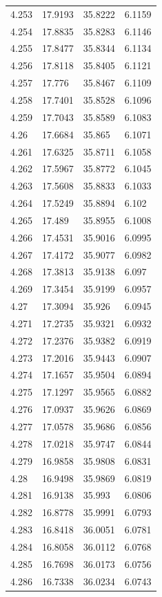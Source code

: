 \begin{tabular}{llll}
4.253 & 17.9193 & 35.8222 & 6.1159 \\
4.254 & 17.8835 & 35.8283 & 6.1146 \\
4.255 & 17.8477 & 35.8344 & 6.1134 \\
4.256 & 17.8118 & 35.8405 & 6.1121 \\
4.257 & 17.776 & 35.8467 & 6.1109 \\
4.258 & 17.7401 & 35.8528 & 6.1096 \\
4.259 & 17.7043 & 35.8589 & 6.1083 \\
4.26 & 17.6684 & 35.865 & 6.1071 \\
4.261 & 17.6325 & 35.8711 & 6.1058 \\
4.262 & 17.5967 & 35.8772 & 6.1045 \\
4.263 & 17.5608 & 35.8833 & 6.1033 \\
4.264 & 17.5249 & 35.8894 & 6.102 \\
4.265 & 17.489 & 35.8955 & 6.1008 \\
4.266 & 17.4531 & 35.9016 & 6.0995 \\
4.267 & 17.4172 & 35.9077 & 6.0982 \\
4.268 & 17.3813 & 35.9138 & 6.097 \\
4.269 & 17.3454 & 35.9199 & 6.0957 \\
4.27 & 17.3094 & 35.926 & 6.0945 \\
4.271 & 17.2735 & 35.9321 & 6.0932 \\
4.272 & 17.2376 & 35.9382 & 6.0919 \\
4.273 & 17.2016 & 35.9443 & 6.0907 \\
4.274 & 17.1657 & 35.9504 & 6.0894 \\
4.275 & 17.1297 & 35.9565 & 6.0882 \\
4.276 & 17.0937 & 35.9626 & 6.0869 \\
4.277 & 17.0578 & 35.9686 & 6.0856 \\
4.278 & 17.0218 & 35.9747 & 6.0844 \\
4.279 & 16.9858 & 35.9808 & 6.0831 \\
4.28 & 16.9498 & 35.9869 & 6.0819 \\
4.281 & 16.9138 & 35.993 & 6.0806 \\
4.282 & 16.8778 & 35.9991 & 6.0793 \\
4.283 & 16.8418 & 36.0051 & 6.0781 \\
4.284 & 16.8058 & 36.0112 & 6.0768 \\
4.285 & 16.7698 & 36.0173 & 6.0756 \\
4.286 & 16.7338 & 36.0234 & 6.0743 \\

\end{tabular}
